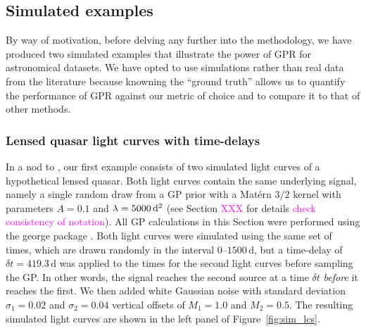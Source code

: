 \documentclass[letterpaper]{ar-1col}
\newcommand{\suz}[1]{\textcolor{magenta}{#1}}
\begin{document}
\subsection{Simulated examples}
\label{sec:sim_examples}

By way of motivation, before delving any further into the methodology, we have produced two simulated examples that illustrate the power of GPR for astronomical datasets. We have opted to use simulations rather than real data from the literature because knowning the ``ground truth'' allows us to quantify the performance of GPR against our metric of choice and to compare it to that of other methods.

\subsubsection{Lensed quasar light curves with time-delays}
\label{sec:sim_quasar}

In a nod to \citet{prh92a}, our first example consists of two simulated light curves of a hypothetical lensed quasar. Both light curves contain the same underlying signal, namely a single random draw from a GP prior with a Mat{\'e}rn $3/2$ kernel with parameters $A=0.1$ and $\lambda=5000\,{\rm d}^2$ (see Section \suz{XXX} for details \suz{check consistency of notation}). All GP calculations in this Section were performed using the {\sc george} package \citep{george}. Both light curves were simulated using the same set of times, which are drawn randomly in the interval $0$--$1500$\,d, but a time-delay of $\delta t=419.3$\,d was applied to the times for the second light curves before sampling the GP. In other words, the signal reaches the second source at a time $\delta t$ \textit{before} it reaches the first. We then added white Gaussian noise with standard deviation $\sigma_1=0.02$ and $\sigma_2=0.04$ vertical offsets of $M_1=1.0$ and $M_2=0.5$. The resulting simulated light curves are shown in the left panel of Figure~\ref{fig:sim_lcs}.
\end{document}
